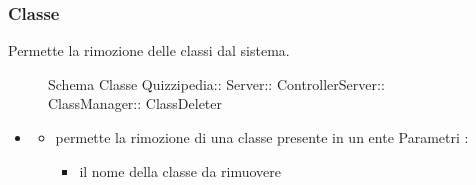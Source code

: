 \subsubsection{Classe }
Permette la rimozione delle classi dal sistema.
\begin{figure}[H]
\centering
\noindent{}
\caption[Schema Classe ClassDeleter]{Schema Classe Quizzipedia:: Server:: ControllerServer:: ClassManager:: ClassDeleter}
\end{figure}
\begin{itemize}
\item {}
\begin{itemize}
\item {}
\newline
permette la rimozione di una classe presente in un ente
\newline
Parametri :
\begin{itemize}
\item {}
\newline
il nome della classe da rimuovere
\end{itemize}
\end{itemize}
\end{itemize}
